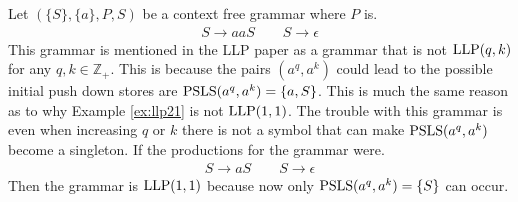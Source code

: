 \begin{example}
    Let $(\{S\}, \{a\}, P, S)$ be a context free grammar where $P$ is.
    \begin{gather*}
        S \to aaS \qquad S \to \epsilon
    \end{gather*}
    This grammar is mentioned in the LLP paper \cite[16]{Vagner2007} as a grammar that is not $\text{LLP}(q,k)$ for any $q, k \in \mathbb{Z}_+$. This is because the pairs $(a^q, a^k)$ could lead to the possible initial push down stores are $\text{PSLS}(a^q, a^k) = \{a, S\}$. This is much the same reason as to why Example \ref{ex:llp21} is not $\text{LLP}(1, 1)$. The trouble with this grammar is even when increasing $q$ or $k$ there is not a symbol that can make $\text{PSLS}(a^q, a^k)$ become a singleton. If the productions for the grammar were.
    \begin{gather*}
        S \to aS \qquad S \to \epsilon
    \end{gather*}
    Then the grammar is $\text{LLP}(1, 1)$ because now only $\text{PSLS}(a^q, a^k) = \{S\}$ can occur.
\end{example}